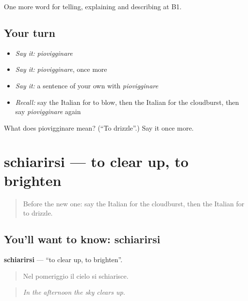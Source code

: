 \begin{grammarlens}[title={What you've built}]
One more word for telling, explaining and describing at B1.
\end{grammarlens}

\subsection*{Your turn}
\begin{itemize}
\raggedright
  \item \emph{Say it:} \emph{piovigginare}
  \item \emph{Say it:} \emph{piovigginare}, once more
  \item \emph{Say it:} a sentence of your own with \emph{piovigginare}
  \item \emph{Recall:} say the Italian for to blow, then the Italian for the cloudburst, then say \emph{piovigginare} again
\end{itemize}

\begin{tcolorbox}[breakable,colback=teal!4,colframe=teal!35!black,title={Before you move on}]
What does piovigginare mean? (\textquotedblleft{}To drizzle\textquotedblright{}.) Say it once more.
\end{tcolorbox}
\section[schiarirsi]{schiarirsi — to clear up, to brighten}

\label{lesson:IT-C470-schiarirsi}



\begin{quote}
Before the new one: say the Italian for the cloudburst, then the Italian for to drizzle.
\end{quote}

\subsection*{You'll want to know: schiarirsi}
\textbf{schiarirsi} — \textquotedblleft{}to clear up, to brighten\textquotedblright{}.

\begin{quote}
Nel pomeriggio il cielo si schiarisce.
\end{quote}

\begin{quote}
\emph{In the afternoon the sky clears up.}
\end{quote}

